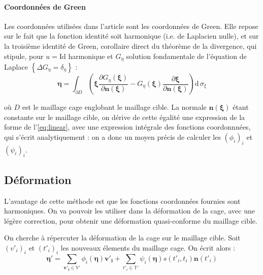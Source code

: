 \documentclass[10pt,a4paper]{article}
\begin{document}
\paragraph{Coordonnées de Green}Les coordonnées utilisées dans l'article sont les coordonnées de Green. Elle repose sur le fait que la fonction identité soit harmonique (i.e. de Laplacien nulle), et sur la troisième identité de Green, corollaire direct du théorème de la divergence, qui stipule, pour $u = \mathrm{Id}$ harmonique et $G_\eta$ solution fondamentale de l'équation de Laplace $\left\lbrace \Delta G_\eta = \delta_\eta \right\rbrace$ :
\begin{equation}
\boldsymbol\eta = \int_{\partial D} \left(
	\boldsymbol\xi
		\frac{\partial G_\eta \left(\boldsymbol\xi \right)}
		{\partial \mathbf{n \left( \boldsymbol\xi \right)}}
	- G_\eta \left( \boldsymbol\xi \right) 
		\frac{\partial \boldsymbol\xi }
		{\partial \mathbf{n \left( \boldsymbol\xi \right)}}
\right)
\mathrm{d}\, \sigma_\xi
\end{equation}

où $D$ est le maillage cage englobant le maillage cible. La normale $\mathbf{n \left( \boldsymbol\xi \right)}$ étant constante sur le maillage cible, on dérive de cette égalité une expression de la forme de l'\autoref{eq:linear}, avec une expression intégrale des fonctions coordonnnées, qui s'écrit analytiquement : on a donc un moyen précis de calculer les $\left( \phi_i \right)_i$ et $\left( \psi_i \right)_i$.

\subsection{Déformation}

L'avantage de cette méthode est que les fonctions coordonnées fournies sont harmoniques. On va pouvoir les utiliser dans la déformation de la cage, avec une légère correction, pour obtenir une déformation quasi-conforme du maillage cible.

On cherche à répercuter la déformation de la cage sur le maillage cible. Soit $\left( v'_i \right)_i$ et $\left( t'_i \right)_i$ les nouveaux élements du maillage cage. On écrit alors :
\begin{equation}
\label{eq:def}
\mathbf{\eta'} = \sum_{\mathbf{v'_i} \in \mathbb{V}'} \phi_i \left( \mathbf{\eta} \right) \mathbf{v'_i} 
+ \sum_{t'_i \in \mathbb{T}'} \psi_i \left( \mathbf{\eta} \right) s \left(t'_i, t_i \right) \mathbf{n} \left( t'_i \right)
\end{equation}
\end{document}
